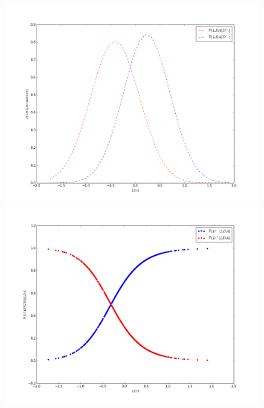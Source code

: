 \documentclass[letter, titlepage, 10pt]{article}
\begin{document}
\begin{appendices}
\begin{figure}[H]
\centering
    \begin{minipage}{.5\textwidth}
        \centering
        \includegraphics[width=1\linewidth]{images/PDF_D6}
    \end{minipage}%
    \begin{minipage}{.5\textwidth}
        \centering
        \includegraphics[width=1\linewidth]{images/CP_D6}
    \end{minipage}
\end{figure}

\end{appendices}
\end{document}
